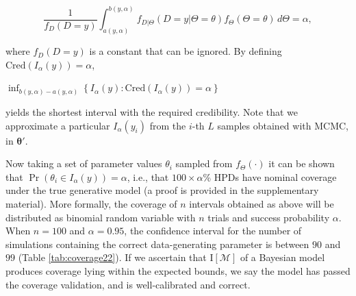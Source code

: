 \documentclass[oneside]{article}
\begin{document}

\begin{equation*}
  \frac{1}{f_D(D=y)} \int_{a(y, \alpha)}^{b(y,\alpha)} f_{D|\Theta}(D=y | \Theta=\theta)f_\Theta(\Theta=\theta)\, d\Theta = \alpha,
\end{equation*}

\noindent where
$f_D(D=y)$
is a constant that can be ignored.
By defining $\text{Cred}(I_\alpha(y)) = \alpha$,

\begin{center}
  \hspace{0cm}
  $\inf_{b(y, \alpha)-a(y, \alpha)} \left \{ I_\alpha(y) : \text{Cred}(I_\alpha(y)) = \alpha \right\}$
\end{center}



\noindent yields the shortest interval with the required credibility.
Note that we approximate a particular $I_\alpha(y_i)$ from the $i$-th $L$ samples obtained with MCMC, in $\boldsymbol{\theta}'$.

Now taking a set of parameter values $\theta_i$ sampled from $f_\Theta(\cdot)$
it can be shown that
$\operatorname{Pr}\left(\theta_i \in I_\alpha(y) \right) = \alpha$, i.e., that $100\times\alpha$\% HPDs have nominal coverage under the true generative model (a proof is provided in the supplementary material).
More formally, the coverage of $n$ intervals obtained as above will be distributed as binomial random variable with $n$ trials and success probability $\alpha$.
When $n=100$ and $\alpha = 0.95$, the confidence interval for the number of simulations containing the correct data-generating parameter is between $90$ and $99$ (Table \ref{tab:coverage22}).
If we ascertain that $\text{I}[\mathcal{M}]$ of a Bayesian model produces coverage lying within the expected bounds, we say the model has passed the coverage validation, and is well-calibrated and correct.
\end{document}
